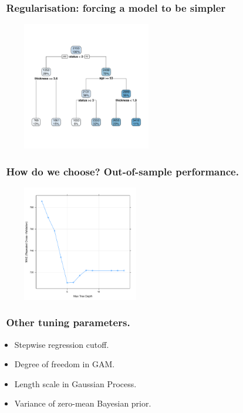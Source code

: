 \documentclass[handout, aspectratio = 169]{beamer}
\begin{document}
\begin{frame}
\frametitle{\insertframenumber~Regularisation: forcing a model to be simpler}
\vspace{-4mm}
\begin{figure}
    \includegraphics[width = 0.5\textwidth]{rpart_depth3.pdf}
\end{figure} 
\end{frame} 





\begin{frame}
\frametitle{\insertframenumber~How do we choose? Out-of-sample performance.}
\vspace{-2mm}
\begin{figure}
    \includegraphics[width = 0.45\textwidth]{rpart_perf.pdf}
\end{figure} 

\end{frame} 


\begin{frame}
\frametitle{\insertframenumber~Other tuning parameters.}
\begin{itemize}
\item Stepwise regression cutoff.
\item Degree of freedom in GAM.
\item Length scale in Gaussian Process.
\item Variance of zero-mean Bayesian prior.
\end{itemize}

\end{frame} 
\end{document}
